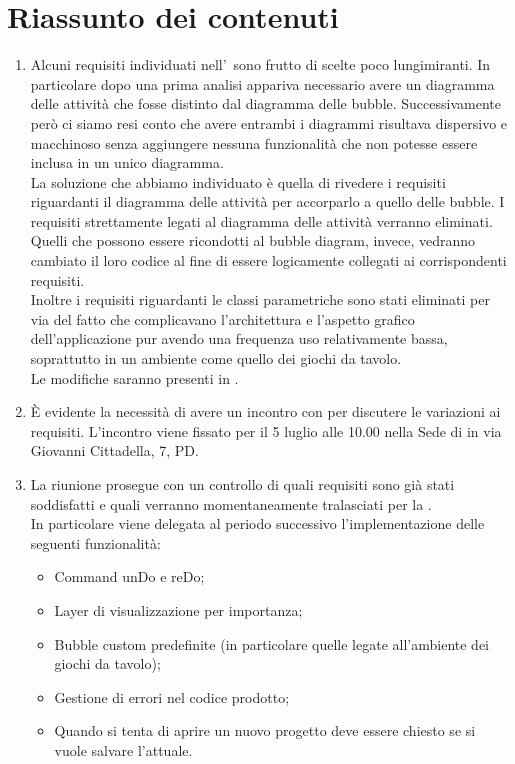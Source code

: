 \documentclass[../AnalisiDeiRequisiti.tex]{subfiles}
\begin{document}
		\section*{Riassunto dei contenuti}
		\begin{enumerate}
		\item Alcuni requisiti individuati nell'\analisideirequisiti\ sono frutto di scelte poco lungimiranti. In particolare dopo una prima analisi appariva necessario avere un diagramma delle attività che fosse distinto dal diagramma delle bubble. Successivamente però ci siamo resi conto che avere entrambi i diagrammi risultava dispersivo e macchinoso senza aggiungere nessuna funzionalità che non potesse essere inclusa in un unico diagramma. \\La soluzione che abbiamo individuato è quella di rivedere i requisiti riguardanti il diagramma delle attività per accorparlo a quello delle bubble. I requisiti strettamente legati al diagramma delle attività verranno eliminati. Quelli che possono essere ricondotti al bubble diagram, invece, vedranno cambiato il loro codice al fine di essere logicamente collegati ai corrispondenti requisiti.\\
		Inoltre i requisiti riguardanti le classi parametriche sono stati eliminati per via del fatto che complicavano l'architettura e l'aspetto grafico dell'applicazione pur avendo una frequenza uso relativamente bassa, soprattutto in un ambiente come quello dei giochi da tavolo.\\
		Le modifiche saranno presenti in \analisideirequisitiv.
		\item È evidente la necessità di avere un incontro con \proponente per discutere le variazioni ai requisiti. L'incontro viene fissato per il 5 luglio alle 10.00 nella Sede di \proponente in via Giovanni Cittadella, 7, PD.
		\item La riunione prosegue con un controllo di quali requisiti sono già stati soddisfatti e quali verranno momentaneamente tralasciati per la \revisionediqualifica.\\
		In particolare viene delegata al periodo successivo l'implementazione delle seguenti funzionalità:
		\begin{itemize}
			\item Command unDo e reDo;
			\item Layer di visualizzazione per importanza;
			\item Bubble custom predefinite (in particolare quelle legate all'ambiente dei giochi da tavolo);
			\item Gestione di errori nel codice prodotto;
			\item Quando si tenta di aprire un nuovo progetto deve essere chiesto se si vuole salvare l'attuale.
		\end{itemize}
		\end{enumerate}
\end{document}
